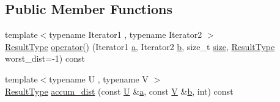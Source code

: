 \subsection*{Public Member Functions}
\begin{DoxyCompactItemize}
\item 
{\footnotesize template$<$typename Iterator1 , typename Iterator2 $>$ }\\\hyperlink{structcvflann_1_1KL__Divergence_adc6bd17c29d9bc0ecea2210dbc47b91a}{Result\-Type} \hyperlink{structcvflann_1_1KL__Divergence_aa0dd99b5214df02d94f068f292415558}{operator()} (Iterator1 \hyperlink{legacy_8hpp_a1031d0e0a97a340abfe0a6ab9e831045}{a}, Iterator2 \hyperlink{legacy_8hpp_ac04272e8ca865b8fba18d36edae9fd2a}{b}, size\-\_\-t \hyperlink{legacy_8hpp_ae97003f8d5c64cdfb99f6f2606d121b6}{size}, \hyperlink{structcvflann_1_1KL__Divergence_adc6bd17c29d9bc0ecea2210dbc47b91a}{Result\-Type} worst\-\_\-dist=-\/1) const 
\item 
{\footnotesize template$<$typename U , typename V $>$ }\\\hyperlink{structcvflann_1_1KL__Divergence_adc6bd17c29d9bc0ecea2210dbc47b91a}{Result\-Type} \hyperlink{structcvflann_1_1KL__Divergence_a6e0ca97fdc7b60bceb0caefa2b21a214}{accum\-\_\-dist} (const \hyperlink{core__c_8h_aa9c521f41af9a5191e5e4b6ffbae211a}{U} \&\hyperlink{legacy_8hpp_a1031d0e0a97a340abfe0a6ab9e831045}{a}, const \hyperlink{core__c_8h_ad8dd4fff0e3910932187b6de0543cae1}{V} \&\hyperlink{legacy_8hpp_ac04272e8ca865b8fba18d36edae9fd2a}{b}, int) const 
\end{DoxyCompactItemize}


